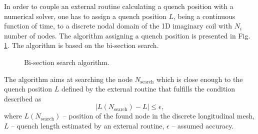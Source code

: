 
In order to couple an external routine calculating a quench position with a numerical solver, one has to assign a quench position $L$, being a continuous function of time, to a discrete nodal domain of the 1D imaginary coil with $N_i$ number of nodes. The algorithm assigning a quench position is presented in Fig. \ref{fig:node_search_algo}. The algorithm is based on the bi-section search. 

\begin{figure}[H]
    \centering
    \caption{Bi-section search algorithm.}
    \label{fig:node_search_algo}
\end{figure}


The algorithm aims at searching the node $N_\text{search}$ which is close enough to the quench position $L$ defined by the external routine that fulfills the condition described as
\begin{equation}
    |L(N_\text{search}) - L| \leq \epsilon,
    \label{eqn:bi-section_search}
\end{equation}
where $L(N_\text{search})$ -- position of the found node in the discrete longitudinal mesh, $L$ -- quench length estimated by an external routine, $\epsilon$ -- assumed accuracy. 

